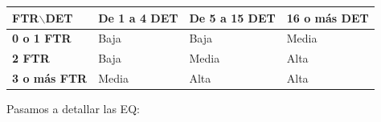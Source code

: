 \documentclass[spanish,a4paper,12pt]{report}	%
\begin{document}
\vspace{0.35cm}

			\begin{tabular}{|p{3cm}||p{3cm}|p{3.2cm}|p{3cm}|}
				\hline
				\textbf{FTR$\backslash$DET} & \textbf{De 1 a 4 DET} & \textbf{De 5 a 15 DET} & \textbf{16  o más DET} \\ \hline \hline
				\textbf{0 o 1 FTR} & Baja & Baja & Media \\ \hline 
				\textbf{2 FTR} & Baja & Media & Alta \\ \hline 
				\textbf{3 o más FTR} & Media & Alta & Alta \\ \hline 
			\end{tabular}

\vspace{0.35cm}

	Pasamos a detallar las EQ:
\end{document}
